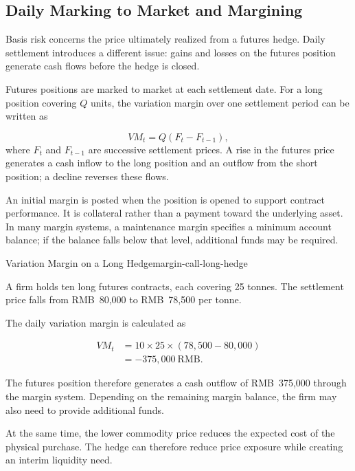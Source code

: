 \subsection{Daily Marking to Market and Margining}

Basis risk concerns the price ultimately realized from a futures hedge. Daily settlement introduces a different issue: gains and losses on the futures position generate cash flows before the hedge is closed.

Futures positions are marked to market at each settlement date. For a long position covering $Q$ units, the variation margin over one settlement period can be written as

\begin{equation}
VM_t=Q(F_t-F_{t-1}),
\label{eq:ch17-variation-margin}
\end{equation}
where $F_t$ and $F_{t-1}$ are successive settlement prices. A rise in the futures price generates a cash inflow to the long position and an outflow from the short position; a decline reverses these flows.

An initial margin is posted when the position is opened to support contract performance. It is collateral rather than a payment toward the underlying asset. In many margin systems, a maintenance margin specifies a minimum account balance; if the balance falls below that level, additional funds may be required.

\begin{example}{Variation Margin on a Long Hedge}{margin-call-long-hedge}

A firm holds ten long futures contracts, each covering 25 tonnes. The settlement price falls from RMB~80,000 to RMB~78,500 per tonne.

The daily variation margin is calculated as

\begin{equation}
\begin{aligned}
VM_t
&=10\times25\times(78{,}500-80{,}000)\\
&=-375{,}000\ \text{RMB}.
\end{aligned}
\end{equation}

The futures position therefore generates a cash outflow of RMB~375,000 through the margin system. Depending on the remaining margin balance, the firm may also need to provide additional funds.

At the same time, the lower commodity price reduces the expected cost of the physical purchase. The hedge can therefore reduce price exposure while creating an interim liquidity need.

\end{example}

